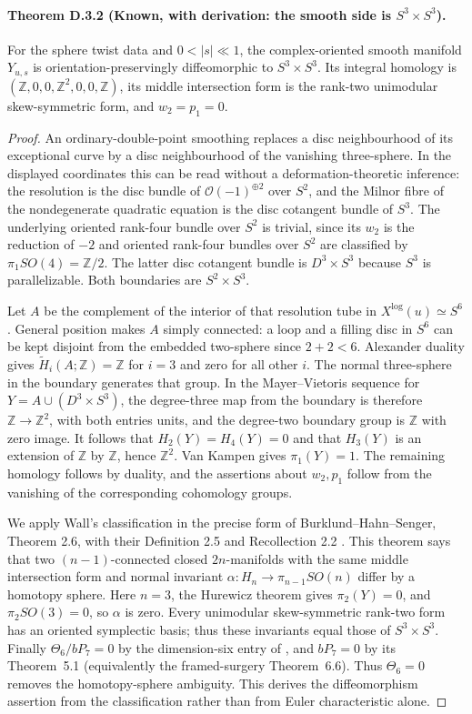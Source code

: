 \paragraph{Theorem D.3.2 (Known, with derivation: the smooth side is $S^3\times S^3$).}
For the sphere twist data and $0<|s|\ll1$, the complex-oriented
smooth manifold $Y_{u,s}$ is orientation-preservingly diffeomorphic
to $S^3\times S^3$. Its integral homology is
$(\mathbb Z,0,0,\mathbb Z^2,0,0,\mathbb Z)$,
its middle intersection form is the rank-two unimodular
skew-symmetric form, and $w_2=p_1=0$.
\begin{proof}
An ordinary-double-point smoothing replaces a disc neighbourhood
of its exceptional curve by a disc neighbourhood of the vanishing
three-sphere. In the displayed coordinates this can be read
without a deformation-theoretic inference: the resolution is the
disc bundle of $\mathcal O(-1)^{\oplus2}$ over $S^2$, and the
Milnor fibre of the nondegenerate quadratic equation is the disc
cotangent bundle of $S^3$. The underlying oriented rank-four
bundle over $S^2$ is trivial, since its $w_2$ is the reduction of
$-2$ and oriented rank-four bundles over $S^2$ are classified by
$\pi_1SO(4)=\mathbb Z/2$. The latter disc cotangent bundle is
$D^3\times S^3$ because $S^3$ is parallelizable. Both boundaries
are $S^2\times S^3$.

Let $A$ be the complement of the interior of that resolution tube
in $X^{\log}(u)\simeq S^6$. General position makes $A$ simply connected:
a loop and a filling disc in $S^6$ can be kept disjoint from the
embedded two-sphere since $2+2<6$. Alexander duality gives
$\widetilde H_i(A;\mathbb Z)=\mathbb Z$ for $i=3$ and zero for
all other $i$. The normal three-sphere in the boundary generates
that group. In the Mayer--Vietoris sequence for
$Y=A\cup(D^3\times S^3)$, the degree-three map from the boundary
is therefore $\mathbb Z\to\mathbb Z^2$, with both entries units,
and the degree-two boundary group is $\mathbb Z$ with zero image.
It follows that $H_2(Y)=H_4(Y)=0$ and that $H_3(Y)$ is an extension
of $\mathbb Z$ by $\mathbb Z$, hence $\mathbb Z^2$.
Van Kampen gives $\pi_1(Y)=1$. The remaining homology follows by
duality, and the assertions about $w_2,p_1$ follow from the
vanishing of the corresponding cohomology groups.

We apply Wall's classification in the precise form of
Burklund--Hahn--Senger, Theorem 2.6, with their Definition 2.5 and
Recollection 2.2 \cite{BHS19}. This theorem says that two
$(n-1)$-connected closed $2n$-manifolds with the same middle
intersection form and normal invariant
$\alpha:H_n\to\pi_{n-1}SO(n)$ differ by a homotopy sphere.
Here $n=3$, the Hurewicz theorem gives $\pi_2(Y)=0$, and
$\pi_2SO(3)=0$, so $\alpha$ is zero. Every unimodular
skew-symmetric rank-two form has an oriented symplectic basis;
thus these invariants equal those of $S^3\times S^3$.
Finally $\Theta_6/bP_7=0$ by the dimension-six entry of
\cite[p.~512]{manKM63}, and $bP_7=0$ by its Theorem~5.1
(equivalently the framed-surgery Theorem~6.6). Thus $\Theta_6=0$
removes the homotopy-sphere ambiguity.
This derives the diffeomorphism assertion from the classification
rather than from Euler characteristic alone.
\end{proof}

